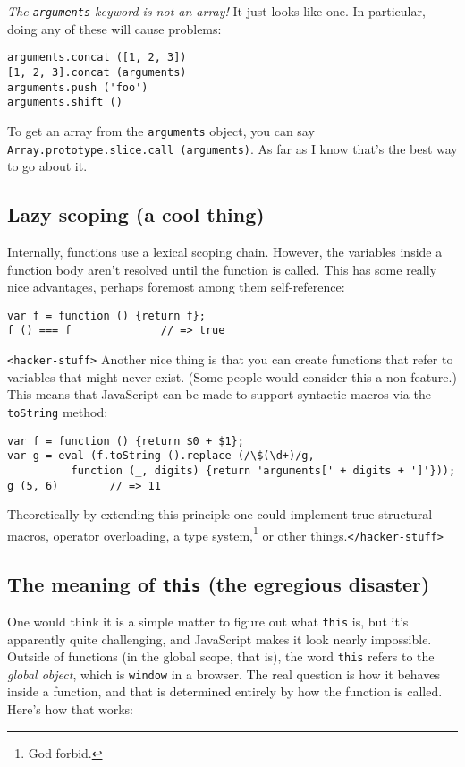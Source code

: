 \documentclass{article}
\begin{document}
    {\it The {\tt arguments} keyword is not an array!} It just looks like one. In particular, doing any of these will cause problems:

\begin{verbatim}
arguments.concat ([1, 2, 3])
[1, 2, 3].concat (arguments)
arguments.push ('foo')
arguments.shift ()
\end{verbatim}

    To get an array from the \verb|arguments| object, you can say \verb|Array.prototype.slice.call (arguments)|. As far as I know that's the best way to go about it.

\subsection {Lazy scoping (a cool thing)}
    Internally, functions use a lexical scoping chain. However, the variables inside a function body aren't resolved until the function is called. This has some really nice advantages,
    perhaps foremost among them self-reference:

\begin{verbatim}
var f = function () {return f};
f () === f              // => true
\end{verbatim}

    \noindent\verb|<hacker-stuff>| Another nice thing is that you can create functions that refer to variables that might never exist. (Some people would consider this a non-feature.) This
    means that JavaScript can be made to support syntactic macros via the \verb|toString| method:

\begin{verbatim}
var f = function () {return $0 + $1};
var g = eval (f.toString ().replace (/\$(\d+)/g,
          function (_, digits) {return 'arguments[' + digits + ']'}));
g (5, 6)        // => 11
\end{verbatim}

    Theoretically by extending this principle one could implement true structural macros, operator overloading, a type system,\footnote{God forbid.} or other things.\verb|</hacker-stuff>|

\subsection {The meaning of {\tt this} (the egregious disaster)}
    One would think it is a simple matter to figure out what \verb|this| is, but it's apparently quite challenging, and JavaScript makes it look nearly impossible. Outside of functions (in
    the global scope, that is), the word \verb|this| refers to the {\it global object}, which is \verb|window| in a browser. The real question is how it behaves inside a function, and that
    is determined entirely by how the function is called. Here's how that works:
    
\end{document}

